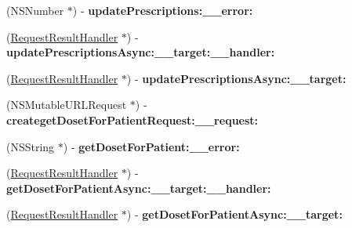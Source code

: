\begin{DoxyCompactItemize}
\item 
\hypertarget{interface_supply_chain_service_port_binding_acde63a7e7677e74dcd5b81078158f69c}{}(N\+S\+Number $\ast$) -\/ {\bfseries update\+Prescriptions\+:\+\_\+\+\_\+error\+:}\label{interface_supply_chain_service_port_binding_acde63a7e7677e74dcd5b81078158f69c}

\item 
\hypertarget{interface_supply_chain_service_port_binding_a88dd8a0a6a75b77d8da897b0b38f4d6f}{}(\hyperlink{interface_request_result_handler}{Request\+Result\+Handler} $\ast$) -\/ {\bfseries update\+Prescriptions\+Async\+:\+\_\+\+\_\+target\+:\+\_\+\+\_\+handler\+:}\label{interface_supply_chain_service_port_binding_a88dd8a0a6a75b77d8da897b0b38f4d6f}

\item 
\hypertarget{interface_supply_chain_service_port_binding_ac6b62092517e66ad7b4465929f5c359e}{}(\hyperlink{interface_request_result_handler}{Request\+Result\+Handler} $\ast$) -\/ {\bfseries update\+Prescriptions\+Async\+:\+\_\+\+\_\+target\+:}\label{interface_supply_chain_service_port_binding_ac6b62092517e66ad7b4465929f5c359e}

\item 
\hypertarget{interface_supply_chain_service_port_binding_a40dc2946f723ed1c3507cbb92df192e5}{}(N\+S\+Mutable\+U\+R\+L\+Request $\ast$) -\/ {\bfseries createget\+Doset\+For\+Patient\+Request\+:\+\_\+\+\_\+request\+:}\label{interface_supply_chain_service_port_binding_a40dc2946f723ed1c3507cbb92df192e5}

\item 
\hypertarget{interface_supply_chain_service_port_binding_a9aa115602edb06d34113536c3e77f3a7}{}(N\+S\+String $\ast$) -\/ {\bfseries get\+Doset\+For\+Patient\+:\+\_\+\+\_\+error\+:}\label{interface_supply_chain_service_port_binding_a9aa115602edb06d34113536c3e77f3a7}

\item 
\hypertarget{interface_supply_chain_service_port_binding_ab69e4b82d160d6f251e325dc4edbe65e}{}(\hyperlink{interface_request_result_handler}{Request\+Result\+Handler} $\ast$) -\/ {\bfseries get\+Doset\+For\+Patient\+Async\+:\+\_\+\+\_\+target\+:\+\_\+\+\_\+handler\+:}\label{interface_supply_chain_service_port_binding_ab69e4b82d160d6f251e325dc4edbe65e}

\item 
\hypertarget{interface_supply_chain_service_port_binding_abac57e438aa975489c18d37e10d98955}{}(\hyperlink{interface_request_result_handler}{Request\+Result\+Handler} $\ast$) -\/ {\bfseries get\+Doset\+For\+Patient\+Async\+:\+\_\+\+\_\+target\+:}\label{interface_supply_chain_service_port_binding_abac57e438aa975489c18d37e10d98955}


\end{DoxyCompactItemize}

